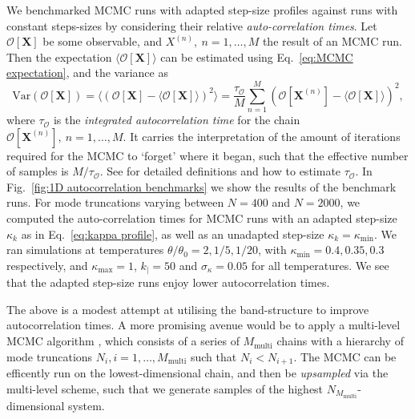 We benchmarked MCMC runs with adapted step-size profiles against runs with constant steps-sizes by considering their relative \textit{auto-correlation times}. Let $\mathcal{O}[\mathbf{X}]$ be some observable, and $X^{(n)},\ n=1,\dots,M$ the result of an MCMC run. Then the expectation $\langle \mathcal{O}[\mathbf{X}] \rangle$ can be estimated using Eq.~\ref{eq:MCMC expectation}, and the variance as
\begin{equation} 
	\text{Var}(\mathcal{O}[\mathbf{X}]) = \langle (\mathcal{O}[\mathbf{X}] - \langle \mathcal{O}[\mathbf{X}] \rangle)^2 \rangle = \frac{\tau_\mathcal{O}}{M} \sum_{n=1}^M (\mathcal{O}[\mathbf{X}^{(n)}] - \langle \mathcal{O}[\mathbf{X}] \rangle)^2,
\end{equation}
where $\tau_\mathcal{O}$ is the \textit{integrated autocorrelation time} for the chain $\mathcal{O}[\mathbf{X}^{(n)}],\ n=1,\dots,M$. It carries the interpretation of the amount of iterations required for the MCMC to `forget' where it began, such that the effective number of samples is $M/\tau_\mathcal{O}$. See \citep{sokalMonteCarloMethods1997, goodmanEnsembleSamplersAffine2010} for detailed definitions and how to estimate $\tau_\mathcal{O}$. In Fig.~\ref{fig:1D autocorrelation benchmarks} we show the results of the benchmark runs. For mode truncations varying between $N=400$ and $N=2000$, we computed the auto-correlation times for MCMC runs with an adapted step-size $\kappa_k$ as in Eq.~\ref{eq:kappa profile}, as well as an unadapted step-size $\kappa_k = \kappa_\text{min}$. We ran simulations at temperatures $\theta/\theta_0 = 2, 1/5,1/20$, with $\kappa_\text{min} = 0.4, 0.35, 0.3$ respectively, and $\kappa_\text{max}=1$, $k_| = 50$ and $\sigma_\kappa = 0.05$ for all temperatures. We see that the adapted step-size runs enjoy lower autocorrelation times.

The above is a modest attempt at utilising the band-structure to improve autocorrelation times. A more promising avenue would be to apply a multi-level MCMC algorithm \citep{gilesMultilevelMonteCarlo2008, dodwellHierarchicalMultilevelMarkov2015, jansenMultilevelMonteCarlo2020, rohrbachMultilevelSimulationHardsphere2022}, which consists of a series of $M_\text{multi}$ chains with a hierarchy of mode truncations $N_{i},i=1,\dots,M_\text{multi}$ such that $N_{i} < N_{i+1}$. The MCMC can be efficently run on the lowest-dimensional chain, and then be \textit{upsampled} via the multi-level scheme, such that we generate samples of the highest $N_{M_\text{multi}}$-dimensional system.





